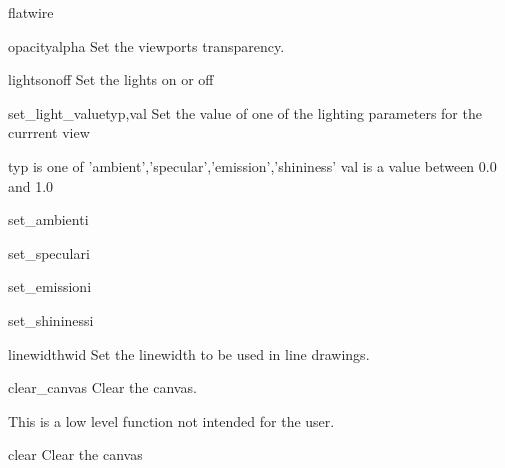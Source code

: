 \begin{funcdesc}{flatwire}{}


\end{funcdesc}


\begin{funcdesc}{opacity}{alpha}
Set the viewports transparency.

\end{funcdesc}


\begin{funcdesc}{lights}{onoff}
Set the lights on or off

\end{funcdesc}


\begin{funcdesc}{set_light_value}{typ,val}
Set the value of one of the lighting parameters for the currrent view

    typ is one of 'ambient','specular','emission','shininess'
    val is a value between 0.0 and 1.0
    

\end{funcdesc}


\begin{funcdesc}{set_ambient}{i}


\end{funcdesc}


\begin{funcdesc}{set_specular}{i}


\end{funcdesc}


\begin{funcdesc}{set_emission}{i}


\end{funcdesc}


\begin{funcdesc}{set_shininess}{i}


\end{funcdesc}


\begin{funcdesc}{linewidth}{wid}
Set the linewidth to be used in line drawings.

\end{funcdesc}


\begin{funcdesc}{clear_canvas}{}
Clear the canvas.

    This is a low level function not intended for the user.
    

\end{funcdesc}


\begin{funcdesc}{clear}{}
Clear the canvas

\end{funcdesc}


